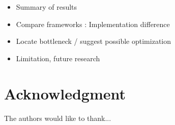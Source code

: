 \documentclass[conference]{IEEEtran}
\begin{document}
\begin{itemize}
  \item Summary of results
  \item Compare frameworks : Implementation difference
  \item Locate bottleneck / suggest possible optimization
  \item Limitation, future research
\end{itemize}

\section*{Acknowledgment}

The authors would like to thank...



\nocite{*}
\end{document}
